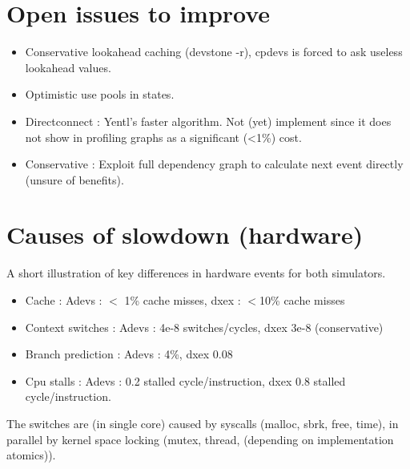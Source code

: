 \documentclass[]{article}
\begin{document}
\section{Open issues to improve}
\begin{itemize}
	\item Conservative lookahead caching (devstone -r), cpdevs is forced to ask useless lookahead values.
	\item Optimistic use pools in states.
	\item Directconnect : Yentl's faster algorithm. Not (yet) implement since it does not show in profiling graphs as a significant (<1\%) cost.
	\item Conservative : Exploit full dependency graph to calculate next event directly (unsure of benefits).
\end{itemize}
\section{Causes of slowdown (hardware)}
A short illustration of key differences in hardware events for both simulators.
\begin{itemize}
	\item Cache : Adevs : $<$ 1\% cache misses, dxex : $<$10\% cache misses
	\item Context switches : Adevs : 4e-8 switches/cycles, dxex 3e-8 (conservative)
	\item Branch prediction : Adevs : 4\%, dxex 0.08%
	\item Cpu stalls : Adevs : 0.2 stalled cycle/instruction, dxex 0.8 stalled cycle/instruction.
\end{itemize}
The switches are (in single core) caused by syscalls (malloc, sbrk, free, time), in parallel by kernel space locking (mutex, thread, (depending on implementation atomics)).
\end{document}

